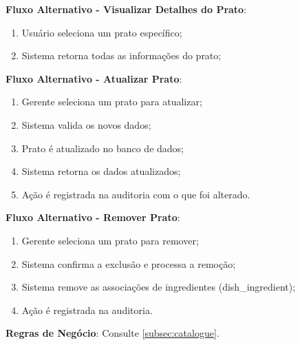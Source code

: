 \begin{itemize}[topsep=1pt, itemsep=0pt]
  \textbf{Fluxo Alternativo - Visualizar Detalhes do Prato}:
  \begin{enumerate}
    \item Usuário seleciona um prato específico;
    \item Sistema retorna todas as informações do prato;
  \end{enumerate}

  \textbf{Fluxo Alternativo - Atualizar Prato}:
  \begin{enumerate}
    \item Gerente seleciona um prato para atualizar;
    \item Sistema valida os novos dados;
    \item Prato é atualizado no banco de dados;
    \item Sistema retorna os dados atualizados;
    \item Ação é registrada na auditoria com o que foi alterado.
  \end{enumerate}

  \textbf{Fluxo Alternativo - Remover Prato}:
  \begin{enumerate}
    \item Gerente seleciona um prato para remover;
    \item Sistema confirma a exclusão e processa a remoção;
    \item Sistema remove as associações de ingredientes (dish\_ingredient);
    \item Ação é registrada na auditoria.
  \end{enumerate}

  \textbf{Regras de Negócio}:
  Consulte \ref{subsec:catalogue}.
\end{itemize}
